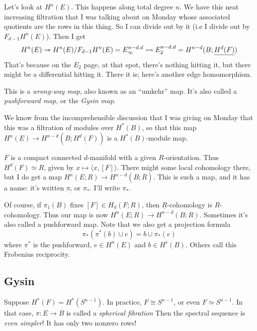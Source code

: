 Let's look at $H^n(E)$.
This happens along total degree $n$.
We have this neat increasing filtration that I was talking about on Monday whose associated quotients are the rows in this thing.
So I can divide out by it (i.e I divide out by $F_{d-1} H^n(E)$).
Then I get 
$$H^n(E) \twoheadrightarrow H^n(E) / F_{d-1} H^n(E) = E^{n-d,d}_\infty \rightarrowtail E_2^{n-d,d} = H^{n-d}(B;\underline{H^d(F)})$$
That's because on the $E_2$ page, at that spot, there's nothing hitting it, but there might be a differential hitting it.
There it is; here's another edge homomorphism.

\begin{remark}
This is a \emph{wrong-way map}, also known as an ``umkehr'' map.
It's also called a \emph{pushforward map}, or the \emph{Gysin map}.
\end{remark}

We know from the incomprehensible discussion that I was giving on Monday that this was a filtration of modules over $H^\ast(B)$, so that this map $H^n(E) \to H^{n-d}(B;\underline{H^d(F)})$ is a $H^\ast(B)$-module map.

\begin{example}
    $F$ is a compact connected $d$-manifold with a given $R$-orientation.
    Thus $H^d(F) \simeq R$, given by $x\mapsto \langle x, [F]\rangle$.
    There might some local cohomology there, but I do get a map $H^n(E;R) \to H^{n-d}(B;\overline{R})$.
    This is such a map, and it has a name: it's written $\pi_!$ or $\pi_\ast$.
    I'll write $\pi_\ast$.
    
    Of course, if $\pi_1(B)$ fixes $[F]\in H_d(F;R)$, then $\underline{R}$-cohomology is $R$-cohomology.
    Thus our map is now $H^n(E;R) \to H^{n-d}(B;R)$.
    Sometimes it's also called a pushforward map.
    Note that we also get a projection formula
    $$
    \pi_\ast(\pi^\ast(b)\cup e) = b\cup \pi_\ast(e)
    $$
    where $\pi^\ast$ is the pushforward, $e\in H^n(E)$ and $b\in H^s(B)$.
    Others call this Frobenius reciprocity.
\end{example}

\subsection{Gysin}

Suppose $H^\ast(F) = H^\ast(S^{n-1})$.
In practice, $F\cong S^{n-1}$, or even $F\simeq S^{n-1}$.
In that case, $\pi:E\to B$ is called a \emph{spherical fibration}
Then the spectral sequence is \emph{even simpler}!
It has only two nonzero rows!

